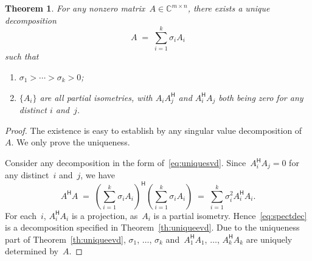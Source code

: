 \documentclass[11pt,a4paper]{article}
\newtheorem{theorem}{Theorem}%
\theoremstyle{definition}
\def\CC{\mathbb{C}}
\newcommand{\hmt}{{\scriptscriptstyle{{\mathsf{H}}}}}
\begin{document}
\begin{theorem}
  \label{th:uniquesvd}
  For any nonzero matrix~$A\in\CC^{m\times n}$, there exists a unique decomposition  
  \begin{equation}
    \label{eq:uniquesvd}
    A \;=\; \sum_{i=1}^k \sigma_i A_i
  \end{equation}
  such that
  \begin{enumerate}[leftmargin=1.5em]
    \item $\sigma_1>\cdots >\sigma_k> 0$;
    \item $\{A_i\}$ are all partial isometries, with 
    $A_i A_j^\hmt$ and $A_i^\hmt A_j$ both being zero for any distinct $i$ and~$j$.
  \end{enumerate}
\end{theorem}

\begin{proof}
  The existence is easy to establish by any singular value decomposition of~$A$. We only prove the
  uniqueness.

  Consider any decomposition in the form of~\eqref{eq:uniquesvd}. 
  Since~$A_i^\hmt A_j = 0$ for any distinct~$i$ and~$j$, we have
  \begin{equation}
    \label{eq:spectdec}
    A^\hmt A \;=\; 
    \left(\sum_{i=1}^k \sigma_iA_i\right)^\hmt 
    \left(\sum_{i=1}^k \sigma_iA_i\right)
    \;=\; \sum_{i=1}^k \sigma_i^2 A_i^\hmt A_i.
  \end{equation}   
  For each~$i$, $A_i^\hmt A_i$ is a projection, as~$A_i$ is a partial isometry.
  Hence~\eqref{eq:spectdec} is a decomposition specified in Theorem~\ref{th:uniqueevd}. Due to the
  uniqueness part of Theorem~\ref{th:uniqueevd}, $\sigma_1$, $\dots$,
  $\sigma_k$ and~$A_1^\hmt A_1$, $\dots$, $A_k^\hmt A_k$  are uniquely determined by~$A$. 


\end{proof}
\end{document}
